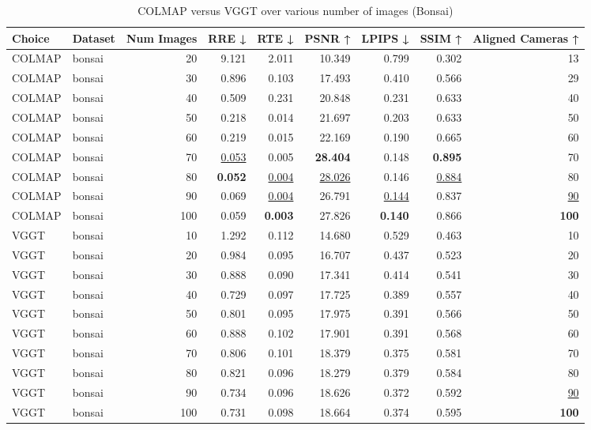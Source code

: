 \begin{table}[H]
\caption{\ifdefined\customcaption \customcaption \else COLMAP versus VGGT over various number of images (Bonsai) \fi}
\label{tab:01_num_images_bonsai}
\centering
\scriptsize
\begin{tabular}{llrrrrrrr}
\toprule
Choice & Dataset & Num Images & RRE ↓ & RTE ↓ & PSNR ↑ & LPIPS ↓ & SSIM ↑ & Aligned Cameras ↑ \\
\midrule
COLMAP & bonsai & 20 & 9.121 & 2.011 & 10.349 & 0.799 & 0.302 & 13 \\
COLMAP & bonsai & 30 & 0.896 & 0.103 & 17.493 & 0.410 & 0.566 & 29 \\
COLMAP & bonsai & 40 & 0.509 & 0.231 & 20.848 & 0.231 & 0.633 & 40 \\
COLMAP & bonsai & 50 & 0.218 & 0.014 & 21.697 & 0.203 & 0.633 & 50 \\
COLMAP & bonsai & 60 & 0.219 & 0.015 & 22.169 & 0.190 & 0.665 & 60 \\
COLMAP & bonsai & 70 & \underline{0.053} & 0.005 & \textbf{28.404} & 0.148 & \textbf{0.895} & 70 \\
COLMAP & bonsai & 80 & \textbf{0.052} & \underline{0.004} & \underline{28.026} & 0.146 & \underline{0.884} & 80 \\
COLMAP & bonsai & 90 & 0.069 & \underline{0.004} & 26.791 & \underline{0.144} & 0.837 & \underline{90} \\
COLMAP & bonsai & 100 & 0.059 & \textbf{0.003} & 27.826 & \textbf{0.140} & 0.866 & \textbf{100} \\
VGGT & bonsai & 10 & 1.292 & 0.112 & 14.680 & 0.529 & 0.463 & 10 \\
VGGT & bonsai & 20 & 0.984 & 0.095 & 16.707 & 0.437 & 0.523 & 20 \\
VGGT & bonsai & 30 & 0.888 & 0.090 & 17.341 & 0.414 & 0.541 & 30 \\
VGGT & bonsai & 40 & 0.729 & 0.097 & 17.725 & 0.389 & 0.557 & 40 \\
VGGT & bonsai & 50 & 0.801 & 0.095 & 17.975 & 0.391 & 0.566 & 50 \\
VGGT & bonsai & 60 & 0.888 & 0.102 & 17.901 & 0.391 & 0.568 & 60 \\
VGGT & bonsai & 70 & 0.806 & 0.101 & 18.379 & 0.375 & 0.581 & 70 \\
VGGT & bonsai & 80 & 0.821 & 0.096 & 18.279 & 0.379 & 0.584 & 80 \\
VGGT & bonsai & 90 & 0.734 & 0.096 & 18.626 & 0.372 & 0.592 & \underline{90} \\
VGGT & bonsai & 100 & 0.731 & 0.098 & 18.664 & 0.374 & 0.595 & \textbf{100} \\
\bottomrule
\end{tabular}
\end{table}